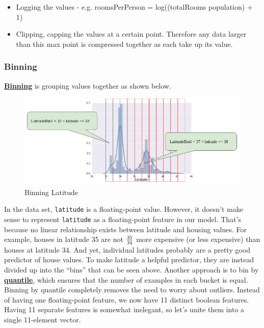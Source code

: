 \documentclass[12pt]{article}
\begin{document}
\begin{itemize}
	\item Logging the values - e.g. roomsPerPerson = log((totalRooms \/ population) + 1)
	\item Clipping, capping the values at a certain point. Therefore any data larger than this max point is compressed together as each take up its value.
\end{itemize}

\subsubsection{Binning}
\href{https://developers.google.com/machine-learning/glossary#binning}{\textbf{Binning}} is grouping values together as shown below.
\begin{figure}[H]
	\includegraphics[scale = 0.5]{imgs/binning.png}
	\centering
	\caption{Binning Latitude}
\end{figure}
In the data set, {\tt{latitude}} is a floating-point value. However, it doesn't make sense to represent {\tt{latitude}} as a floating-point feature in our model. That's because no linear relationship exists between latitude and housing values. For example, houses in latitude 35 are not ${35}\over{34}$ more expensive (or less expensive) than houses at latitude 34. And yet, individual latitudes probably are a pretty good predictor of house values.
To make latitude a helpful predictor, they are instead divided up into the ``bins'' that can be seen above. Another approach is to bin by \href{https://wikipedia.org/wiki/Quantile}{\textbf{quantile}}, which ensures that the number of examples in each bucket is equal. Binning by quantile completely removes the need to worry about outliers.
Instead of having one floating-point feature, we now have 11 distinct boolean features. Having 11 separate features is somewhat inelegant, so let's unite them into a single 11-element vector.
\end{document}
